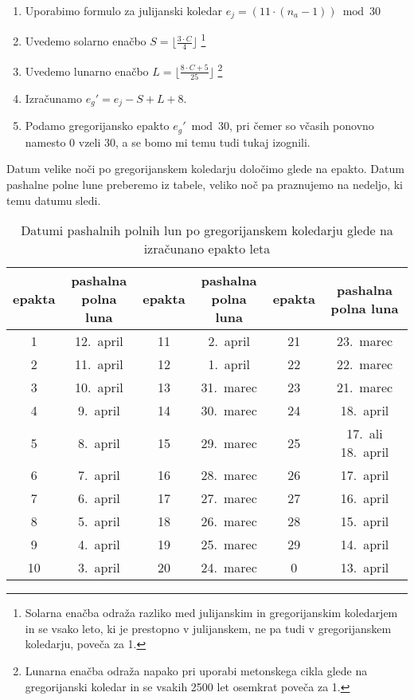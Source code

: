 \documentclass[a4paper,12pt]{article}
\begin{document}
\begin{enumerate}
    \item Uporabimo formulo za julijanski koledar 
        $e_j = (11 \cdot (n_a - 1)) \bmod 30$
    \item Uvedemo solarno enačbo $S = \lfloor \frac{3 \cdot C}{4} \rfloor $ 
        \footnote{Solarna enačba odraža razliko med julijanskim in gregorijanskim koledarjem in se 
        vsako leto, ki je prestopno v julijanskem, ne pa tudi v gregorijanskem 
        koledarju, poveča za 1.}
    \item Uvedemo lunarno enačbo $L = \lfloor \frac{8 \cdot C + 5}{25} \rfloor $
        \footnote{Lunarna enačba odraža napako pri uporabi metonskega cikla glede na gregorijanski 
        koledar in se vsakih 2500 let osemkrat poveča za 1.}
    \item Izračunamo $e_g' = e_j - S + L + 8$. %
    \item Podamo gregorijansko epakto $e_g' \bmod 30$, pri čemer so včasih ponovno 
        namesto 0 vzeli 30, a se bomo mi temu tudi tukaj izognili. %
\end{enumerate}

Datum velike noči po gregorijanskem koledarju določimo glede na epakto. Datum 
pashalne polne lune preberemo iz tabele, veliko noč pa praznujemo na nedeljo, 
ki temu datumu sledi.

\begin{table}
    \centering
    \caption{Datumi pashalnih polnih lun po gregorijanskem koledarju glede na izračunano epakto leta}
    \label{gregorijanski-t}
    \begin{tabular}{| c c | c c | c c |}
        \hline
        epakta & \makecell{pashalna \\ polna luna} & epakta & \makecell{pashalna \\ polna luna} & epakta & \makecell{pashalna \\ polna luna} \\ \hline
        1 & 12.\ april & 11 & 2.\ april & 21 & 23.\ marec \\  
        2 & 11.\ april & 12 & 1.\ april & 22 & 22.\ marec \\
        3 & 10.\ april & 13 & 31.\ marec & 23 & 21.\ marec \\
        4 & 9.\ april & 14 & 30.\ marec & 24 & 18.\ april \\
        5 & 8.\ april & 15 & 29.\ marec & 25 & 17.\ ali 18.\ april \\
        6 & 7.\ april & 16 & 28.\ marec & 26 & 17.\ april \\
        7 & 6.\ april & 17 & 27.\ marec & 27 & 16.\ april \\
        8 & 5.\ april & 18 & 26.\ marec & 28 & 15.\ april \\
        9 & 4.\ april & 19 & 25.\ marec & 29 & 14.\ april \\
        10 & 3.\ april & 20 & 24.\ marec & 0 & 13.\ april \\ \hline
    \end{tabular}
\end{table}
\end{document}
